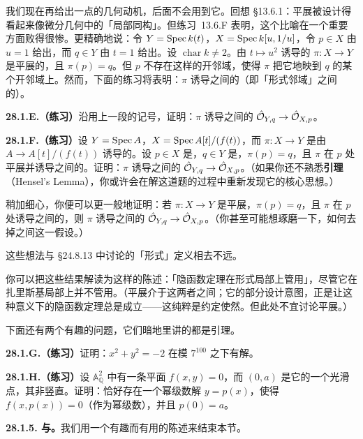 我们现在再给出一点\trCompletion{}的几何动机，后面不会用到它。回想 \S13.6.1：平展\trMorphism{}被设计得看起来像微分几何中的「局部同构」。但\mbox{练习~13.6.F} 表明，这个比喻在一个重要方面败得很惨。更精确地说：令 $Y=\operatorname{Spec} k(t)$，$X=\operatorname{Spec} k[u,1/u]$，令 $p\in X$ 由 $u=1$ 给出，而 $q\in Y$ 由 $t=1$ 给出。设 $\operatorname{char}k\ne 2$。由 $t\mapsto u^2$ 诱导的\trMorphism{} $\pi\colon X\to Y$ 是平展的，且 $\pi(p)=q$。但 $p$ 不存在这样的开邻域，使得 $\pi$ 把它\trIsomorphic{}地映到 $q$ 的某个开邻域上。然而，下面的练习将表明：$\pi$ 诱导\trCompletion{}之间的\trIsomorphism（即「形式邻域」之间的\trIsomorphism）。

\textbf{28.1.E.（练习）}\quad 沿用上一段的记号，证明：$\pi$ 诱导\trCompletion{}之间的\trIsomorphism{} $\hat{\mathcal{O}}_{Y,q}\to\hat{\mathcal{O}}_{X,p}$。

\textbf{28.1.F.（练习）}\quad 设 $Y=\operatorname{Spec} A$，$X=\operatorname{Spec} A[t]/(f(t))$，而 $\pi\colon X\to Y$ 是由 $A\to A[t]/(f(t))$ 诱导的\trMorphism。设 $p\in X$ 是\trClosedPoint，$q\in Y$ 是\trClosedPoint，$\pi(p)=q$，且 $\pi$ 在 $p$ 处平展并诱导\trResidueField{}之间的\trIsomorphism。证明：$\pi$ 诱导\trCompletion{}之间的\trIsomorphism{} $\hat{\mathcal{O}}_{Y,q}\to\hat{\mathcal{O}}_{X,p}$。（如果你还不熟悉\textbf{\trHensel{}引理}（Hensel's Lemma），你或许会在解这道题的过程中重新发现它的核心思想。）

稍加细心，你便可以更一般地证明：若 $\pi\colon X\to Y$ 是平展\trMorphism，$\pi(p)=q$，且 $\pi$ 在 $p$ 处诱导\trResidueField{}之间的\trIsomorphism，则 $\pi$ 诱导\trCompletion{}之间的\trIsomorphism{} $\hat{\mathcal{O}}_{Y,q}\to\hat{\mathcal{O}}_{X,p}$。（你甚至可能想琢磨一下，如何去掉\trResidueField{}之间\trIsomorphism{}这一假设。）

这些想法与 \S24.8.13 中讨论的「形式\trEtale」定义相去不远。

你可以把这些结果解读为这样的陈述：「隐函数定理在形式局部上管用」，尽管它在扎里斯基局部上并不管用。（平展\trTopology{}介于这两者之间；它的部分设计意图，正是让这种意义下的隐函数定理总是成立——这纯粹是约定使然。但此处不宜讨论平展\trTopology。）

下面还有两个有趣的问题，它们暗地里讲的都是\trHensel{}引理。

\textbf{28.1.G.（练习）}\quad 证明：$x^2+y^2=-2$ 在模 $7^{100}$ 之下有解。

\textbf{28.1.H.（练习）}\quad 设 $\mathbb{A}^2_{\mathbb{Q}}$ 中有一条平面\trCurve{} $f(x,y)=0$，而 $(0,a)$ 是它的一个光滑点，其\trTangentLine{}非竖直。证明：恰好存在一个幂级数解 $y=p(x)$，使得 $f(x,p(x))=0$（作为幂级数），并且 $p(0)=a$。

\textbf{28.1.5. \trCompletion{}与\trExactness。}\quad 我们用一个有趣而有用的陈述来结束本节。

